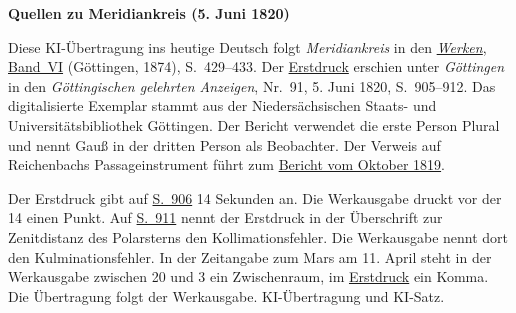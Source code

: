 \clearpage\thispagestyle{empty}
\begin{center}\textbf{Quellen zu Meridiankreis (5. Juni 1820)}\end{center}
\noindent Diese KI-Übertragung ins heutige Deutsch folgt \textit{Meridiankreis} in den \href{https://gdz.sub.uni-goettingen.de/id/PPN236007467}{\textit{Werken}, Band~VI} (Göttingen, 1874), S.~429--433. Der \href{https://images.p.sub.uni-goettingen.de/iiif/image/gdz:PPN319721507_1820:00000901/full/1600,/0/default.jpg}{Erstdruck} erschien unter \textit{Göttingen} in den \textit{Göttingischen gelehrten Anzeigen}, Nr.~91, 5. Juni 1820, S.~905--912. Das digitalisierte Exemplar stammt aus der Niedersächsischen Staats- und Universitätsbibliothek Göttingen. Der Bericht verwendet die erste Person Plural und nennt Gauß in der dritten Person als Beobachter. Der Verweis auf Reichenbachs Passageinstrument führt zum \hyperlink{native-427-part-lower}{Bericht vom Oktober 1819}.
\par\smallskip\noindent Der Erstdruck gibt auf \href{https://images.p.sub.uni-goettingen.de/iiif/image/gdz:PPN319721507_1820:00000902/full/1600,/0/default.jpg}{S.~906} 14 Sekunden an. Die Werkausgabe druckt vor der 14 einen Punkt. Auf \href{https://images.p.sub.uni-goettingen.de/iiif/image/gdz:PPN319721507_1820:00000907/full/1600,/0/default.jpg}{S.~911} nennt der Erstdruck in der Überschrift zur Zenitdistanz des Polarsterns den Kollimationsfehler. Die Werkausgabe nennt dort den Kulminationsfehler. In der Zeitangabe zum Mars am 11. April steht in der Werkausgabe zwischen 20 und 3 ein Zwischenraum, im \href{https://images.p.sub.uni-goettingen.de/iiif/image/gdz:PPN319721507_1820:00000908/full/1600,/0/default.jpg}{Erstdruck} ein Komma. Die Übertragung folgt der Werkausgabe. KI-Übertragung und KI-Satz.
\clearpage

